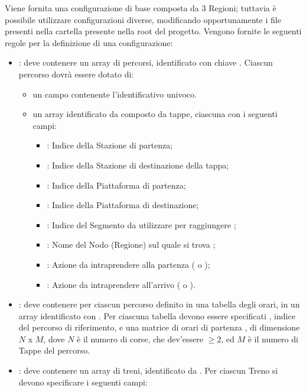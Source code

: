 	Viene fornita una configurazione di base composta da 3 Regioni; tuttavia è possibile utilizzare configurazioni diverse, modificando opportunamente i file  presenti nella cartella  presente nella root del progetto. Vengono fornite le seguenti regole per la definizione di una configurazione:
	\begin{itemize}
		\item {}: deve contenere un array di percorsi, identificato con chiave . Ciascun percorso dovrà essere dotato di:
			\begin{itemize}
				\item un campo  contenente l'identificativo univoco.
				\item un array identificato da  composto da tappe, ciascuna con i seguenti campi:
					\begin{itemize}
						\item {}: Indice della Stazione di partenza;
						\item {}: Indice della Stazione di destinazione della tappa;
						\item {}: Indice della Piattaforma di partenza;
						\item {}: Indice della Piattaforma di destinazione;
						\item {}: Indice del Segmento da utilizzare per raggiungere ;
						\item {}: Nome del Nodo (Regione) sul quale si trova ;
						\item {}: Azione da intraprendere alla partenza ( o );
						\item {}: Azione da intraprendere all'arrivo ( o ).
					\end{itemize}
			\end{itemize}
		\item {}: deve contenere per ciascun percorso definito in  una tabella degli orari, in un array identificato con . Per ciascuna tabella devono essere specificati , indice del percorso di riferimento, e una matrice di orari di partenza , di dimensione $N$ x $M$, dove $N$ è il numero di corse, che dev'essere $\ge 2$, ed $M$ è il numero di Tappe del percorso.
		\item {}: deve contenere un array di treni, identificato da . Per ciascun Treno si devono specificare i seguenti campi:

\end{itemize}
